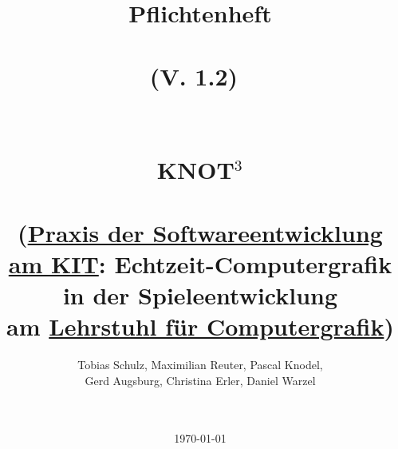 %
%


%
%







	\title{	
		Pflichtenheft\\~\\\textmd{\Large(V. 1.2)}~\\~\\~\\
		\Huge{KNOT$^3$}\\~\\
		\Large (\href{http://pp.info.uni-karlsruhe.de/lehre/WS201314/pse/}{Praxis der Softwareentwicklung am KIT}: Echtzeit-Computergrafik in der Spieleentwicklung \\am \href{http://cg.ibds.kit.edu/index.php}{Lehrstuhl für Computergrafik})
	}
	
	\author{
		Tobias Schulz, Maximilian Reuter, Pascal Knodel,\\
	 	Gerd Augsburg, Christina Erler, Daniel Warzel
	} 
	 
	\date{~\\~\\\today}
	
	\maketitle





